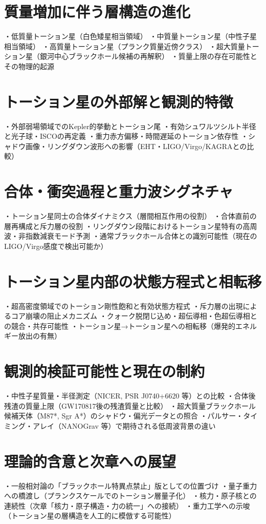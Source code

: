 \documentclass[dvipdfmx,a4paper]{jsbook}
\theoremstyle{definition}
\theoremstyle{remark}
\begin{document}
\section{質量増加に伴う層構造の進化}
    ・低質量トーション星（白色矮星相当領域）
    ・中質量トーション星（中性子星相当領域）
    ・高質量トーション星（プランク質量近傍クラス）
    ・超大質量トーション星（銀河中心ブラックホール候補の再解釈）
    ・質量上限の存在可能性とその物理的起源

\section{トーション星の外部解と観測的特徴}
    ・外部弱場領域でのKepler的挙動とトーション尾
    ・有効シュワルツシルト半径と光子球・ISCOの再定義
    ・重力赤方偏移・時間遅延のトーション依存性
    ・シャドウ画像・リングダウン波形への影響（EHT・LIGO/Virgo/KAGRAとの比較）

\section{合体・衝突過程と重力波シグネチャ}
    ・トーション星同士の合体ダイナミクス（層間相互作用の役割）
    ・合体直前の層再構成と斥力層の役割
    ・リングダウン段階におけるトーション星特有の高周波・非指数減衰モード予測
    ・通常ブラックホール合体との識別可能性（現在のLIGO/Virgo感度で検出可能か）

\section{トーション星内部の状態方程式と相転移}
    ・超高密度領域でのトーション剛性飽和と有効状態方程式
    ・斥力層の出現によるコア崩壊の阻止メカニズム
    ・クォーク脱閉じ込め・超伝導相・色超伝導相との競合・共存可能性
    ・トーション星→トーション星への相転移（爆発的エネルギー放出の有無）

\section{観測的検証可能性と現在の制約}
    ・中性子星質量・半径測定（NICER, PSR J0740+6620 等）との比較
    ・合体後残渣の質量上限（GW170817後の残渣質量と比較）
    ・超大質量ブラックホール候補天体（M87*, Sgr A*）のシャドウ・偏光データとの照合
    ・パルサー・タイミング・アレイ（NANOGrav 等）で期待される低周波背景の違い

\section{理論的含意と次章への展望}
    ・一般相対論の「ブラックホール特異点禁止」版としての位置づけ
    ・量子重力への橋渡し（プランクスケールでのトーション層量子化）
    ・核力・原子核との連続性（次章「核力・原子構造・力の統一」への接続）
    ・重力工学への示唆（トーション星の層構造を人工的に模倣する可能性）
\end{document}
